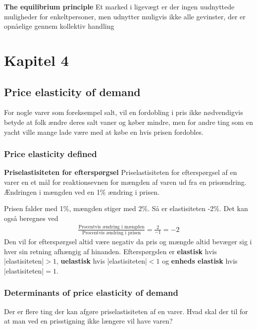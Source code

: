 \begin{defn}\textbf{The equilibrium principle} %
\newline 
Et marked i ligevægt er der ingen uudnyttede muligheder for enkeltpersoner, men udnytter muligvis ikke alle gevinster, der er opnåelige gennem kollektiv handling
\end{defn}

\section{Kapitel 4}
\subsection{Price elasticity of demand} 
For nogle varer som foreksempel salt, vil en fordobling i pris ikke nødvendigvis betyde at folk ændre deres salt vaner og køber mindre, men for andre ting som en yacht ville mange lade være med at købe en hvis prisen fordobles. 
\subsubsection{Price elasticity defined}
\begin{defn}\textbf{Priselastisiteten for efterspørgsel} %
\newline
Priselastisiteten for efterspørgsel af en varer en et mål for reaktionsevnen for mængden af varen ud fra en prisændring. Ændringen i mængden ved en 1\% ændring i prisen. 
\end{defn}
Prisen falder med 1\%, mængden stiger med 2\%. Så er elastisiteten -2\%. Det kan også beregnes ved 
\begin{align*}
    \frac{\text{Procentvis ændring i mængden}}{\text{Procentvis ændring i prisen}} = \frac{2}{-1}=-2
\end{align*}
Den vil for efterspørgsel altid være negativ da pris og mængde altid bevæger sig i hver sin retning afhængig af hinanden. Efterspørgslen er \textbf{elastisk} hvis |elastisiteten|$>1$, \textbf{uelastisk} hvis |elastisiteten|$<1$ og \textbf{enheds elastisk} hvis |elastisiteten|$=1$.

\subsubsection{Determinants of price elasticity of demand}
Der er flere ting der kan afgøre priselastisiteten af en varer. Hvad skal der til for at man ved en prisstigning ikke længere vil have varen?


